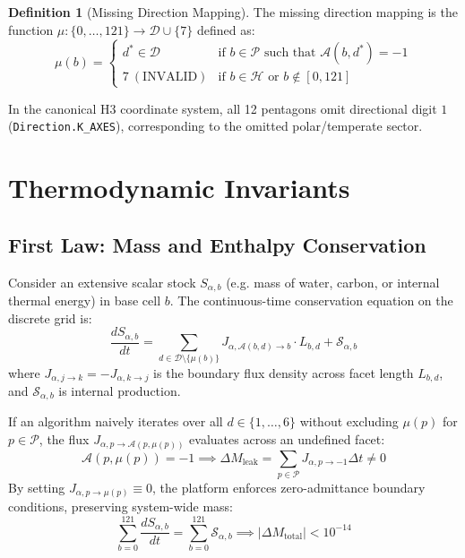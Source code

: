 \documentclass[11pt,a4paper]{article}
\theoremstyle{definition}
\newtheorem{definition}{Definition}[section]
\begin{document}
\begin{definition}[Missing Direction Mapping]
The missing direction mapping is the function $\mu: \{0, \dots, 121\} \to \mathcal{D} \cup \{7\}$ defined as:
\begin{equation}
\mu(b) = \begin{cases}
d^* \in \mathcal{D} & \text{if } b \in \mathcal{P} \text{ such that } \mathcal{A}(b, d^*) = -1 \\
7 \ (\text{INVALID}) & \text{if } b \in \mathcal{H} \text{ or } b \notin [0, 121]
\end{cases}
\end{equation}
\end{definition}

In the canonical H3 coordinate system, all 12 pentagons omit directional digit $1$ (\texttt{Direction.K\_AXES}), corresponding to the omitted polar/temperate sector.

\section{Thermodynamic Invariants}

\subsection{First Law: Mass and Enthalpy Conservation}
Consider an extensive scalar stock $S_{\alpha, b}$ (e.g. mass of water, carbon, or internal thermal energy) in base cell $b$. The continuous-time conservation equation on the discrete grid is:
\begin{equation}
\frac{d S_{\alpha, b}}{dt} = \sum_{d \in \mathcal{D} \setminus \{\mu(b)\}} J_{\alpha, \mathcal{A}(b, d) \to b} \cdot L_{b, d} + \mathcal{S}_{\alpha, b}
\end{equation}
where $J_{\alpha, j \to k} = -J_{\alpha, k \to j}$ is the boundary flux density across facet length $L_{b, d}$, and $\mathcal{S}_{\alpha, b}$ is internal production.

If an algorithm naively iterates over all $d \in \{1, \dots, 6\}$ without excluding $\mu(p)$ for $p \in \mathcal{P}$, the flux $J_{\alpha, p \to \mathcal{A}(p, \mu(p))}$ evaluates across an undefined facet:
\begin{equation}
\mathcal{A}(p, \mu(p)) = -1 \implies \Delta M_{\text{leak}} = \sum_{p \in \mathcal{P}} J_{\alpha, p \to -1} \Delta t \ne 0
\end{equation}
By setting $J_{\alpha, p \to \mu(p)} \equiv 0$, the platform enforces zero-admittance boundary conditions, preserving system-wide mass:
\begin{equation}
\sum_{b=0}^{121} \frac{d S_{\alpha, b}}{dt} = \sum_{b=0}^{121} \mathcal{S}_{\alpha, b} \implies \left| \Delta M_{\text{total}} \right| < 10^{-14}
\end{equation}
\end{document}
